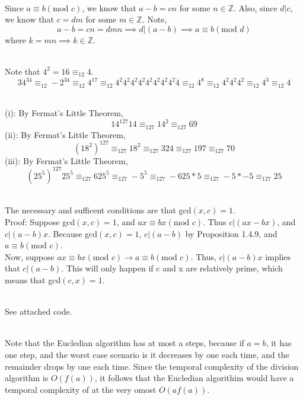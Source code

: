 \documentclass[letterpaper,12pt]{article}
\theoremstyle{definition}
\begin{document}
\\
Since $a \equiv b(\text{mod }c)$, we know that $a-b = cn$ for some $n \in \mathbb{Z}$.
Also, since $d|c$, we know that $c = dm$ for some $m \in \mathbb{Z}$. Note,\\
\[a-b = cn = dmn \implies d|(a-b) \implies a \equiv b(\text{mod }d)\]
where $k = mn \implies k \in \mathbb{Z}$.

\\
Note that $4^2 = 16 \equiv_{12} 4$.
\[
    34^{34} \equiv_{12} -2^{34} \equiv_{12} 4^{17} \equiv_{12} 4^2 4^2 4^2 4^2 4^2
    4^2 4^2 4^2 4 \equiv_{12} 4^8 \equiv_{12} 4^2 4^2 4^2 \equiv_{12} 4^3 \equiv_{12} 4
\]

\\
(i): By Fermat's Little Theorem, \\
\[
    14^{127} 14 \equiv_{127} 14^2 \equiv_{127} 69
\]
(ii): By Fermat's Little Theorem, \\
\[
    (18^2)^{127} \equiv_{127} 18^2 \equiv_{127} 324 \equiv_{127} 197 \equiv_{127} 70
\]
(iii): By Fermat's Little Theorem, \\
\[
    (25^5)^{127} 25^5 \equiv_{127} 625^5 \equiv_{127} -5^5 \equiv_{127} -625*5 
    \equiv_{127} -5*-5 \equiv_{127} 25
\]

\\
The necessary and sufficent conditions are that gcd$(x,c) = 1$.\\
Proof: Suppose gcd$(x,c) = 1$, and $ax \equiv bx (\text{mod }c)$. Thus $c|(ax - bx)$,
and $c|(a-b)x$. Because gcd$(x,c) = 1$, $c|(a-b)$ by Proposition 1.4.9, and 
$a \equiv b (\text{mod }c)$.\\
Now, suppose $ax \equiv bx (\text{mod } c) \rightarrow a \equiv b (\text{mod } c)$. Thus,
$c|(a-b)x$ implies that $c|(a-b)$. This will only happen if c and x are relatively prime,
which means that gcd$(c,x) = 1$.

\\
See attached code.

\\
Note that the Eucledian algorithm has at most a steps, because if $a = b$, it has one step, and the worst case scenario is it decreases by one each time, and the remainder drops by one each time. Since the temporal complexity of the division algorithm is $O(f(a))$, it follows that the Eucledian algorithim would have a temporal complexity of at the very omost $O(af(a))$.
\end{document}
